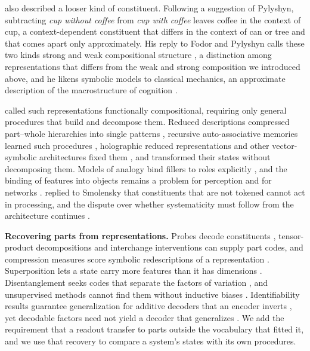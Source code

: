 \documentclass[10pt]{article}
\theoremstyle{plain}
\theoremstyle{remark}
\begin{document}
\citet{smolensky1988} also described a looser kind of constituent. Following a suggestion of Pylyshyn, subtracting \emph{cup without coffee} from \emph{cup with coffee} leaves coffee in the context of cup, a context-dependent constituent that differs in the context of can or tree and that comes apart only approximately. His reply to Fodor and Pylyshyn calls these two kinds strong and weak compositional structure \citep{smolensky1987}, a distinction among representations that differs from the weak and strong composition we introduced above, and he likens symbolic models to classical mechanics, an approximate description of the macrostructure of cognition \citep{smolensky1988}.

\citet{vangelder1990} called such representations functionally compositional, requiring only general procedures that build and decompose them. Reduced descriptions compressed part--whole hierarchies into single patterns \citep{hinton1990}, recursive auto-associative memories learned such procedures \citep{pollack1990}, holographic reduced representations and other vector-symbolic architectures fixed them \citep{plate1995,gayler2006,kanerva2009}, and \citet{chalmers1990} transformed their states without decomposing them. Models of analogy bind fillers to roles explicitly \citep{hummel1997}, and the binding of features into objects remains a problem for perception and for networks \citep{treisman1980,greff2020}. \citet{fodor1990} replied to Smolensky that constituents that are not tokened cannot act in processing, and the dispute over whether systematicity must follow from the architecture continues \citep{goodale2026}.

\textbf{Recovering parts from representations.} Probes decode constituents \citep{belinkov2022}, tensor-product decompositions \citep{mccoy2019} and interchange interventions \citep{geiger2021} can supply part codes, and compression measures score symbolic redescriptions of a representation \citep{andreas2019,elmoznino2024,elmoznino2026}. Superposition lets a state carry more features than it has dimensions \citep{elhage2022}. Disentanglement seeks codes that separate the factors of variation \citep{bengio2013}, and unsupervised methods cannot find them without inductive biases \citep{locatello2019}. Identifiability results guarantee generalization for additive decoders that an encoder inverts \citep{lachapelle2023,wiedemer2024}, yet decodable factors need not yield a decoder that generalizes \citep{montero2021}. We add the requirement that a readout transfer to parts outside the vocabulary that fitted it, and we use that recovery to compare a system's states with its own procedures.
\end{document}
